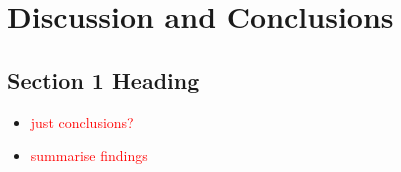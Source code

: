 \chapter{Discussion and Conclusions}
\thispagestyle{empty}
\section{Section 1 Heading}

\begin{itemize}
    \item \textcolor{red}{just conclusions?}
    \item \textcolor{red}{summarise findings}
\end{itemize}

\lipsum[1]